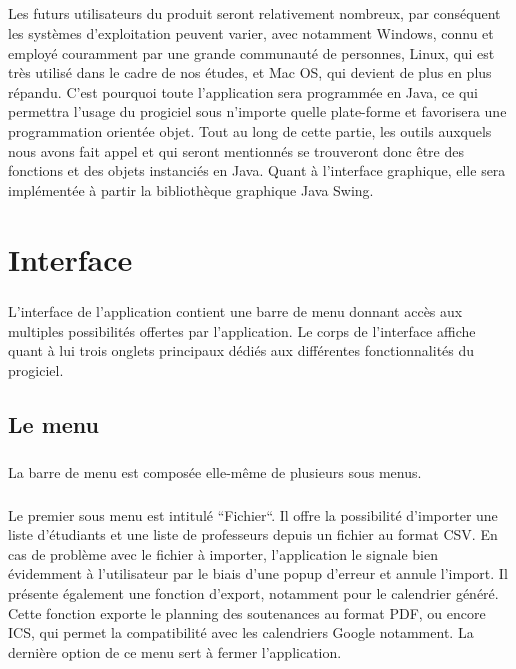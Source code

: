 \documentclass[a4paper,10pt]{report}
\begin{document}
	\paragraph{}
	  Les futurs utilisateurs du produit seront relativement nombreux, par conséquent les systèmes d'exploitation peuvent varier, avec notamment Windows, connu et employé couramment par une grande communauté de personnes, Linux, qui est très utilisé dans le cadre de nos études, et Mac OS, qui devient de plus en plus répandu.
	  C'est pourquoi toute l'application sera programmée en Java, ce qui permettra l'usage du progiciel sous n'importe quelle plate-forme et favorisera une programmation orientée objet.
	  Tout au long de cette partie, les outils auxquels nous avons fait appel et qui seront mentionnés se trouveront donc être des fonctions et des objets instanciés en Java.
	  Quant à l'interface graphique, elle sera implémentée à partir la bibliothèque graphique Java Swing.
  
  
  \chapter{Interface}
	\paragraph{}
	  L'interface de l'application contient une barre de menu donnant accès aux multiples possibilités offertes par l'application.
	  Le corps de l'interface affiche quant à lui trois onglets principaux dédiés aux différentes fonctionnalités du progiciel. 
	  
	\section{Le menu}
	
	  \paragraph{}
	    La barre de menu est composée elle-même de plusieurs sous menus.
	  \paragraph{}
	    Le premier sous menu est intitulé ``Fichier``. Il offre la possibilité d'importer une liste d'étudiants et une liste de professeurs depuis un fichier au format CSV.
	    En cas de problème avec le fichier à importer, l'application le signale bien évidemment à l'utilisateur par le biais d'une popup d'erreur et annule l'import.
	    Il présente également une fonction d'export, notamment pour le calendrier généré. Cette fonction exporte le planning des soutenances au format PDF, ou encore ICS, qui permet la compatibilité avec les calendriers Google notamment.
	    La dernière option de ce menu sert à fermer l'application.
\end{document}
